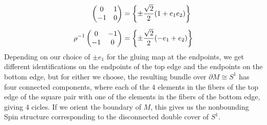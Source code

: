 \begin{exmp}
\begin{align*}
\begin{pmatrix}
0 & 1 \\
-1 & 0
\end{pmatrix} &= \left\lbrace \pm\frac{\sqrt{2}}{2}(1 + e_1e_2) \right\rbrace \\[5pt]
\rho^{-1}\begin{pmatrix}
0 & -1 \\
-1 & 0
\end{pmatrix} &= \left\lbrace \pm\frac{\sqrt{2}}{2}(-e_1 + e_2) \right\rbrace
\end{align*}
%
Depending on our choice of $\pm e_1$ for the gluing map at the endpoints, we
get different identifications on the endpoints of the top edge and the
endpoints on the bottom edge, but for either we choose, the resulting bundle
over $\partial M \cong S^1$ has four connected components, where each of the
$4$ elements in the fibers of the top edge of the square pair with one of the
elements in the fibers of the bottom edge, giving $4$ cicles. If we orient
the boundary of $M$, this gives us the nonbounding Spin structure corresponding
to the disconnected double cover of $S^1$. \\


\end{exmp}
